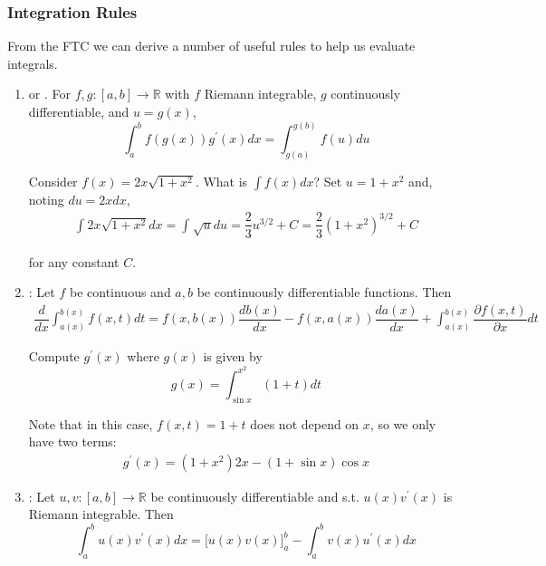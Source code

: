 \documentclass{article}
\begin{document}
\subsubsection{Integration Rules}
\label{ssub:integration_rules}

From the FTC we can derive a number of useful rules to help us evaluate integrals.
\begin{enumerate}
  \item {} or . For $f, g: [a, b] \to \mathbb{R}$ with $f$ Riemann integrable, $g$ continuously differentiable, and $u = g(x)$,
    \[
      \int_{a}^{b} f(g(x)) g^\prime(x) dx
      =
      \int_{g(a)}^{g(b)} f(u) du
    \]

    \begin{example}
      Consider $f(x) = 2x \sqrt{1 + x^2}$. What is $\int f(x) dx$? Set $u = 1 + x^2$ and, noting $du = 2x dx$,
      \begin{align*}
        \int_{}^{} 2x \sqrt{1 + x^2} dx
        =
        \int_{}^{} \sqrt{u} du
        =
        \dfrac{2}{3} u^{3/2} + C
        =
        \dfrac{2}{3} \left(1 + x^2\right)^{3/2} + C
      \end{align*}

      for any constant $C$.
    \end{example}

  \item {}: Let $f$ be continuous and $a, b$ be continuously differentiable functions. Then
    \begin{align*}
      \dfrac{d}{dx} \int_{a(x)}^{b(x)} f(x, t) dt
      =
      f(x, b(x)) \dfrac{db(x)}{dx}
      -
      f(x, a(x)) \dfrac{da(x)}{dx}
      +
      \int_{a(x)}^{b(x)}
      \dfrac{\partial f(x, t)}{\partial x} dt
    \end{align*}
    
    \begin{example}
      Compute $g^\prime(x)$ where $g(x)$ is given by
      \[
        g(x) = \int_{\sin x}^{x^2} (1 + t) dt
      \]

      Note that in this case, $f(x, t) = 1 + t$ does not depend  on $x$, so we only have two terms:
      \begin{align*}
        g^\prime(x)
        =
        (1 + x^2) 2x
        -
        (1 + \sin x) \cos x
      \end{align*}
    \end{example}

  \item {}: Let $u, v: [a, b] \to \mathbb{R}$ be continuously differentiable and s.t. $u(x) v^\prime(x)$ is Riemann integrable. Then
    \[
      \int_{a}^{b} u(x) v^\prime(x) dx
      =
      \Big[
        u(x) v(x)
      \Big]_{a}^b
      -
      \int_{a}^{b} v(x) u^\prime(x) dx
    \]


\end{enumerate}
\end{document}

